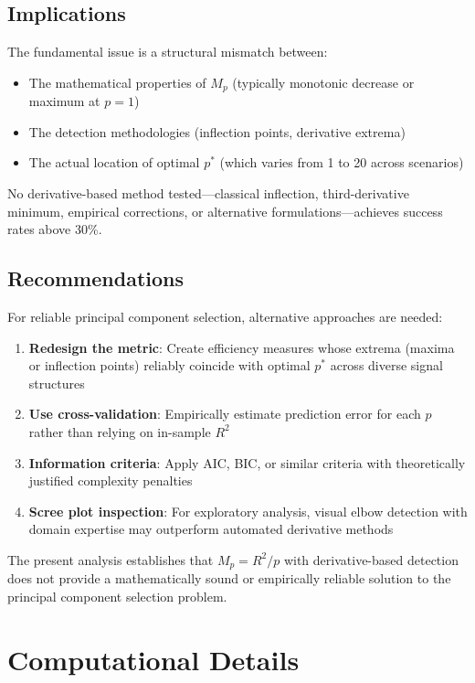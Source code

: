 \documentclass[11pt,a4paper]{article}
\begin{document}
\subsection{Implications}

The fundamental issue is a structural mismatch between:
\begin{itemize}
\item The mathematical properties of $M_p$ (typically monotonic decrease or maximum at $p = 1$)
\item The detection methodologies (inflection points, derivative extrema)
\item The actual location of optimal $p^*$ (which varies from 1 to 20 across scenarios)
\end{itemize}

No derivative-based method tested—classical inflection, third-derivative minimum, empirical corrections, or alternative formulations—achieves success rates above 30\%.

\subsection{Recommendations}

For reliable principal component selection, alternative approaches are needed:
\begin{enumerate}
\item \textbf{Redesign the metric}: Create efficiency measures whose extrema (maxima or inflection points) reliably coincide with optimal $p^*$ across diverse signal structures
\item \textbf{Use cross-validation}: Empirically estimate prediction error for each $p$ rather than relying on in-sample $R^2$
\item \textbf{Information criteria}: Apply AIC, BIC, or similar criteria with theoretically justified complexity penalties
\item \textbf{Scree plot inspection}: For exploratory analysis, visual elbow detection with domain expertise may outperform automated derivative methods
\end{enumerate}

The present analysis establishes that $M_p = R^2/p$ with derivative-based detection does not provide a mathematically sound or empirically reliable solution to the principal component selection problem.

\appendix

\section{Computational Details}
\end{document}
